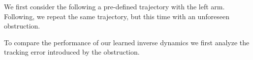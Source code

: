     We first consider the \robot{} following a pre-defined trajectory with the left arm.
    Following, we repeat the same trajectory, but this time with an unforeseen obstruction. 

    To compare the performance of our learned inverse dynamics we first analyze the tracking error introduced by the obstruction.
    

	


